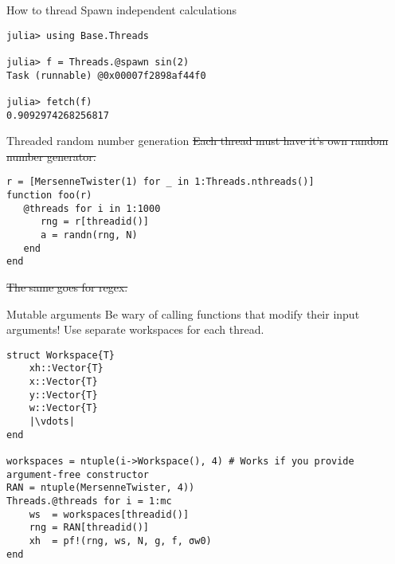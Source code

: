\documentclass[10pt]{beamer}
\begin{document}
\begin{frame}[fragile]{How to thread}{}
    Spawn independent calculations
    \begin{verbatim}
julia> using Base.Threads

julia> f = Threads.@spawn sin(2)
Task (runnable) @0x00007f2898af44f0

julia> fetch(f)
0.9092974268256817
    \end{verbatim}


\end{frame}


\begin{frame}[fragile]{Threaded random number generation}{}
\sout{Each thread must have it's own random number generator.}
    \begin{verbatim}
r = [MersenneTwister(1) for _ in 1:Threads.nthreads()]
function foo(r)
   @threads for i in 1:1000
      rng = r[threadid()]
      a = randn(rng, N)
   end
end
    \end{verbatim}
    \sout{The same goes for regex.}
\end{frame}


\begin{frame}[fragile]{Mutable arguments}{}
    Be wary of calling functions that modify their input arguments! Use separate workspaces for each thread.
\begin{verbatim}
struct Workspace{T}
    xh::Vector{T}
    x::Vector{T}
    y::Vector{T}
    w::Vector{T}
    |\vdots|
end

workspaces = ntuple(i->Workspace(), 4) # Works if you provide argument-free constructor
RAN = ntuple(MersenneTwister, 4))
Threads.@threads for i = 1:mc
	ws  = workspaces[threadid()]
	rng = RAN[threadid()]
	xh  = pf!(rng, ws, N, g, f, σw0)
end
\end{verbatim}

\end{frame}
\end{document}
